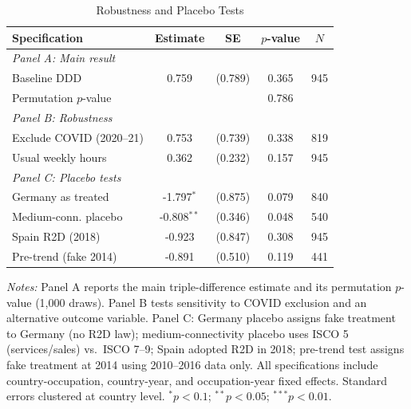 \begin{table}[htbp]
\centering
\caption{Robustness and Placebo Tests}
\label{tab:robustness}
\begin{tabular}{lcccc}
\toprule
Specification & Estimate & SE & $p$-value & $N$ \\
\midrule
\textit{Panel A: Main result} & & & & \\
\quad Baseline DDD & 0.759 & (0.789) & 0.365 & 945 \\
\quad Permutation $p$-value & & & 0.786 & \\
\addlinespace
\textit{Panel B: Robustness} & & & & \\
\quad Exclude COVID (2020--21) & 0.753 & (0.739) & 0.338 & 819 \\
\quad Usual weekly hours & 0.362 & (0.232) & 0.157 & 945 \\
\addlinespace
\textit{Panel C: Placebo tests} & & & & \\
\quad Germany as treated & -1.797$^{*}$ & (0.875) & 0.079 & 840 \\
\quad Medium-conn. placebo & -0.808$^{**}$ & (0.346) & 0.048 & 540 \\
\quad Spain R2D (2018) & -0.923 & (0.847) & 0.308 & 945 \\
\quad Pre-trend (fake 2014) & -0.891 & (0.510) & 0.119 & 441 \\
\bottomrule
\end{tabular}
\begin{tablenotes}
\small
\item \textit{Notes:} Panel A reports the main triple-difference estimate and its permutation $p$-value (1,000 draws).
Panel B tests sensitivity to COVID exclusion and an alternative outcome variable.
Panel C: Germany placebo assigns fake treatment to Germany (no R2D law);
medium-connectivity placebo uses ISCO 5 (services/sales) vs.~ISCO 7--9;
Spain adopted R2D in 2018; pre-trend test assigns fake treatment at 2014 using 2010--2016 data only.
All specifications include country-occupation, country-year, and occupation-year fixed effects.
Standard errors clustered at country level. $^{*}p<0.1$; $^{**}p<0.05$; $^{***}p<0.01$.
\end{tablenotes}
\end{table}
